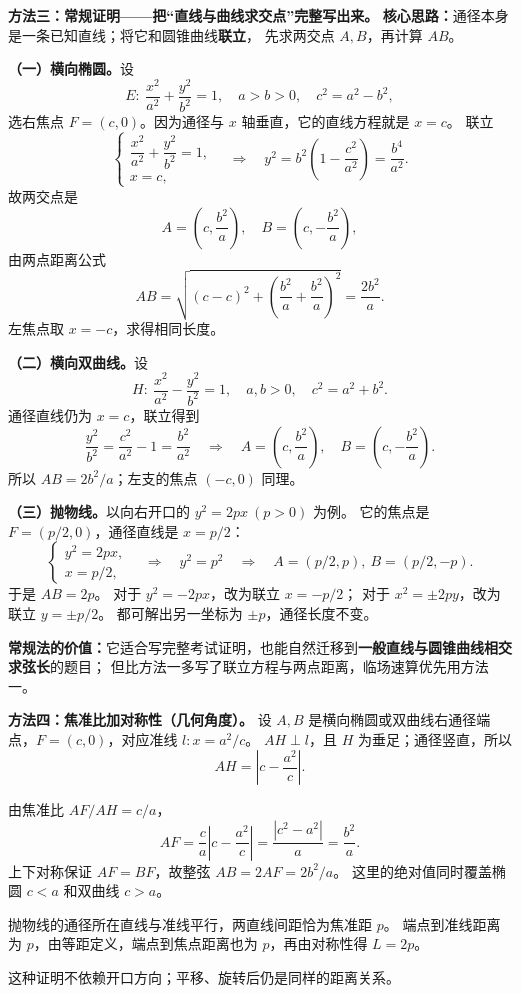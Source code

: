 \clearpage
\begin{proofbox}
\textbf{方法三：常规证明——把“直线与曲线求交点”完整写出来。}
\textbf{核心思路：}通径本身是一条已知直线；将它和圆锥曲线\textbf{联立}，
先求两交点 $A,B$，再计算 $AB$。

\textbf{（一）横向椭圆。}设
\[
 E:\ \frac{x^2}{a^2}+\frac{y^2}{b^2}=1,\quad
 a>b>0,\quad c^2=a^2-b^2,
\]
选右焦点 $F=(c,0)$。因为通径与 $x$ 轴垂直，它的直线方程就是 $x=c$。
联立
\[
 \begin{cases}
 \dfrac{x^2}{a^2}+\dfrac{y^2}{b^2}=1,\\[2pt]
 x=c,
 \end{cases}
 \quad\Rightarrow\quad
 y^2=b^2\left(1-\frac{c^2}{a^2}\right)
 =\frac{b^4}{a^2}.
\]
故两交点是
\[
 A=\left(c,\frac{b^2}{a}\right),\quad
 B=\left(c,-\frac{b^2}{a}\right),
\]
由两点距离公式
\[
 AB=\sqrt{(c-c)^2+
 \left(\frac{b^2}{a}+\frac{b^2}{a}\right)^2}
 =\boxed{\frac{2b^2}{a}}.
\]
左焦点取 $x=-c$，求得相同长度。

\textbf{（二）横向双曲线。}设
\[
 H:\ \frac{x^2}{a^2}-\frac{y^2}{b^2}=1,
 \quad a,b>0,\quad c^2=a^2+b^2.
\]
通径直线仍为 $x=c$，联立得到
\[
 \frac{y^2}{b^2}=\frac{c^2}{a^2}-1
 =\frac{b^2}{a^2}
 \quad\Rightarrow\quad
 A=\left(c,\frac{b^2}{a}\right),\quad
 B=\left(c,-\frac{b^2}{a}\right).
\]
所以 $AB=\boxed{2b^2/a}$；左支的焦点 $(-c,0)$ 同理。

\textbf{（三）抛物线。}以向右开口的 $y^2=2px\ (p>0)$ 为例。
它的焦点是 $F=(p/2,0)$，通径直线是 $x=p/2$：
\[
 \begin{cases}y^2=2px,\\x=p/2,\end{cases}
 \quad\Rightarrow\quad y^2=p^2
 \quad\Rightarrow\quad
 A=(p/2,p),\ B=(p/2,-p).
\]
于是 $AB=\boxed{2p}$。
对于 $y^2=-2px$，改为联立 $x=-p/2$；
对于 $x^2=\pm2py$，改为联立 $y=\pm p/2$。
都可解出另一坐标为 $\pm p$，通径长度不变。

\textbf{常规法的价值：}它适合写完整考试证明，也能自然迁移到\textbf{一般直线与圆锥曲线相交求弦长}的题目；
但比方法一多写了联立方程与两点距离，临场速算优先用方法一。
\end{proofbox}
\clearpage
\begin{proofbox}
\textbf{方法四：焦准比加对称性（几何角度）。}
设 $A,B$ 是横向椭圆或双曲线右通径端点，$F=(c,0)$，对应准线 $l:x=a^2/c$。
$AH\perp l$，且 $H$ 为垂足；通径竖直，所以
\[
 AH=\left|c-\frac{a^2}{c}\right|.
\]

由焦准比 $AF/AH=c/a$，
\[
 AF=\frac ca\left|c-\frac{a^2}{c}\right|
 =\frac{|c^2-a^2|}{a}=\frac{b^2}{a}.
\]
上下对称保证 $AF=BF$，故整弦 $AB=2AF=2b^2/a$。
这里的绝对值同时覆盖椭圆 $c<a$ 和双曲线 $c>a$。

\medskip
抛物线的通径所在直线与准线平行，两直线间距恰为焦准距 $p$。
端点到准线距离为 $p$，由等距定义，端点到焦点距离也为 $p$，再由对称性得 $L=2p$。

这种证明不依赖开口方向；平移、旋转后仍是同样的距离关系。
\end{proofbox}
\clearpage

